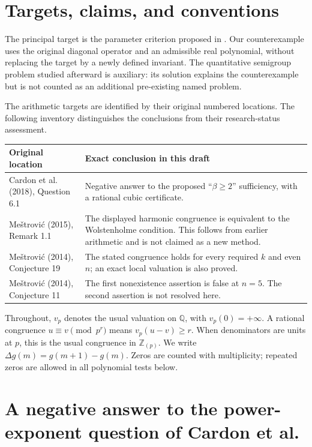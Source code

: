 \documentclass[11pt,a4paper]{article}
\theoremstyle{definition}
\theoremstyle{remark}
\begin{document}
\section{Targets, claims, and conventions}
\label{sec:targets}

The principal target is the parameter criterion proposed in
\cite[Question~6.1]{CardonEtAl2018}.  Our counterexample uses the original
diagonal operator and an admissible real polynomial, without replacing
the target by a newly defined invariant.  The quantitative semigroup
problem studied afterward is auxiliary: its solution explains the
counterexample but is not counted as an additional pre-existing named
problem.

The arithmetic targets are identified by their original numbered
locations.  The following inventory distinguishes the conclusions from
their research-status assessment.

\begin{center}
\small
\begin{tabularx}{\textwidth}{@{}L{0.30\textwidth}Y@{}}
\toprule
Original location & Exact conclusion in this draft\\
\midrule
Cardon et al. (2018), Question 6.1 & Negative answer to the proposed
``$\beta\ge2$'' sufficiency, with a rational cubic certificate.\\[4pt]
Me\v{s}trovi\'c (2015), Remark 1.1 & The displayed harmonic congruence is
equivalent to the Wolstenholme condition.  This follows from earlier
arithmetic and is not claimed as a new method.\\[4pt]
Me\v{s}trovi\'c (2014), Conjecture 19 & The stated congruence holds for
every required $k$ and even $n$; an exact local valuation is also proved.\\[4pt]
Me\v{s}trovi\'c (2014), Conjecture 11 & The first nonexistence assertion
is false at $n=5$.  The second assertion is not resolved here.\\
\bottomrule
\end{tabularx}
\end{center}

Throughout, $v_p$ denotes the usual valuation on $\mathbb Q$, with
$v_p(0)=+\infty$.  A rational congruence $u\equiv v\pmod{p^r}$ means
$v_p(u-v)\ge r$.  When denominators are units at $p$, this is the usual
congruence in $\mathbb Z_{(p)}$.  We write
$\Delta g(m)=g(m+1)-g(m)$.  Zeros are counted with multiplicity;
repeated zeros are allowed in all polynomial tests below.
\section{A negative answer to the power-exponent question of Cardon et al.}
\label{sec:cardon-counterexample}
\end{document}

